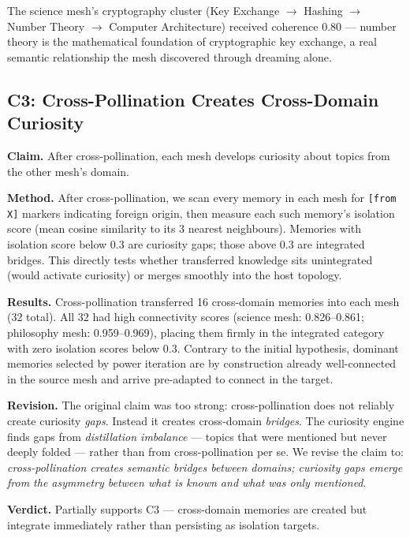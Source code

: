 \documentclass[11pt]{article}
\begin{document}
The science mesh's cryptography cluster (Key Exchange $\to$ Hashing $\to$
Number Theory $\to$ Computer Architecture) received coherence 0.80 --- number
theory is the mathematical foundation of cryptographic key exchange, a real
semantic relationship the mesh discovered through dreaming alone.

\subsection{C3: Cross-Pollination Creates Cross-Domain Curiosity}

\textbf{Claim.} After cross-pollination, each mesh develops curiosity about
topics from the other mesh's domain.

\textbf{Method.} After cross-pollination, we scan every memory in each mesh for
\texttt{[from X]} markers indicating foreign origin, then measure each such
memory's isolation score (mean cosine similarity to its 3 nearest neighbours).
Memories with isolation score below 0.3 are curiosity gaps; those above 0.3
are integrated bridges. This directly tests whether transferred knowledge sits
unintegrated (would activate curiosity) or merges smoothly into the host
topology.

\textbf{Results.} Cross-pollination transferred 16 cross-domain memories into
each mesh (32 total). All 32 had high connectivity scores (science mesh:
0.826--0.861; philosophy mesh: 0.959--0.969), placing them firmly in the
integrated category with zero isolation scores below 0.3. Contrary to the
initial hypothesis, dominant memories selected by power iteration are by
construction already well-connected in the source mesh and arrive pre-adapted to
connect in the target.

\textbf{Revision.} The original claim was too strong: cross-pollination does not
reliably create curiosity \emph{gaps}. Instead it creates cross-domain
\emph{bridges}. The curiosity engine finds gaps from \emph{distillation
imbalance} --- topics that were mentioned but never deeply folded --- rather
than from cross-pollination per se. We revise the claim to: \emph{cross-pollination
creates semantic bridges between domains; curiosity gaps emerge from the
asymmetry between what is known and what was only mentioned}.

\textbf{Verdict.} Partially supports C3 --- cross-domain memories are created
but integrate immediately rather than persisting as isolation targets.

\end{document}
